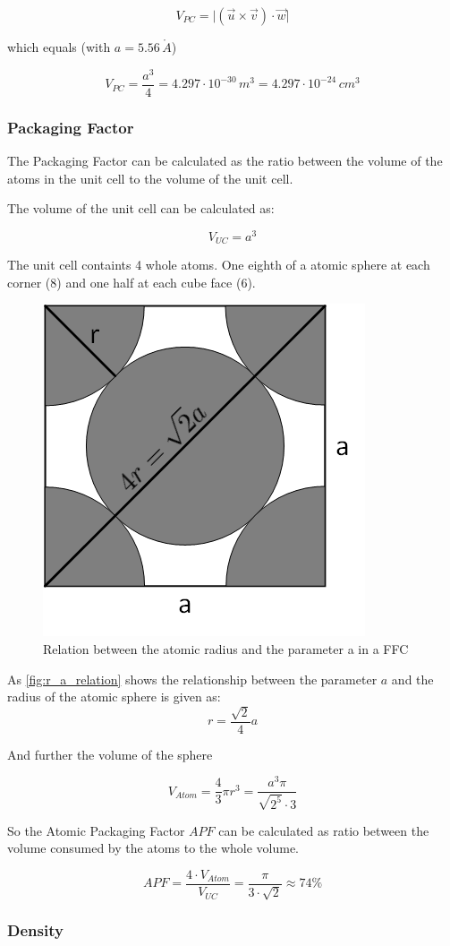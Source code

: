 $$V_{PC} = \vert (\vec{u} \times \vec{v})  \cdot \vec{w} \vert$$

which equals (with $a = 5.56 \, \mathring{A}$)

$$V_{PC} = \frac{a^3}{4} = 4.297 \cdot 10^{-30} \,m^3 = 4.297 \cdot 10^{-24} \,cm^3$$
\subsubsection*{Packaging Factor}

The Packaging Factor can be calculated as the ratio between the
volume of the atoms in the unit cell to the volume of the unit cell.

The volume of the unit cell can be calculated as:

$$V_{UC} = a^3$$


The unit cell containts 4 whole atoms.
One eighth of a atomic sphere at each corner (8) and one half at 
each cube face (6).

\begin{figure}[H]
	\centering
	\includegraphics[width=0.3\linewidth]{Graphics/Chapter1/r_a_relation}
	\caption{Relation between the atomic radius and the parameter a in a FFC}
	\label{fig:r_a_relation}
\end{figure}

 As \autoref{fig:r_a_relation} shows the relationship between the parameter $a$ and the radius of the atomic sphere is given as:
$$r = \frac{\sqrt{2}}{4} a $$

And further the volume of the sphere

$$V_{Atom} = \frac{4}{3} \pi r^3 = \frac{a^3 \pi}{\sqrt{2^5}\cdot 3}$$

So the Atomic Packaging Factor $APF$ can be calculated as ratio between the
volume consumed by the atoms to the whole volume.

$$APF = \frac{4 \cdot V_{Atom} }{V_{UC}} = \frac{\pi}{3 \cdot \sqrt{2}} \approx 74\%$$


\subsubsection*{Density}

